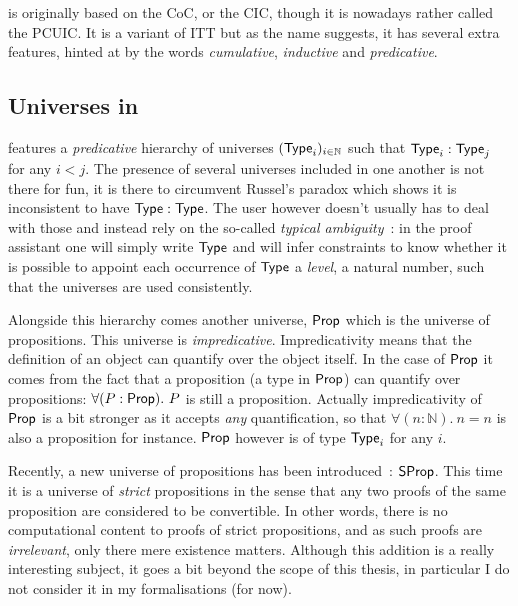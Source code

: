 \Coq is originally based on the \acrfull{CoC}, or the \acrfull{CIC}, though it
is nowadays rather called the \acrfull{PCUIC}.
It is a variant of \acrshort{ITT} but as the name suggests, it has several
extra features, hinted at by the words \emph{cumulative}, \emph{inductive}
and \emph{predicative}.

\subsection{Universes in \Coq}

\Coq features a \emph{predicative} hierarchy of universes
\((\mathsf{Type}_i)_{i \in \mathbb{N}}\) such that \(\mathsf{Type}_i : \mathsf{Type}_j\) for any
\(i < j\). The presence of several universes included in one another is not
there for fun, it is there to circumvent Russel's paradox which
shows it is inconsistent to have \(\mathsf{Type} : \mathsf{Type}\).
The \Coq user however doesn't usually has to deal with those and
instead rely on the so-called
\emph{typical ambiguity}~:
in the \Coq proof assistant one will simply write \(\mathsf{Type}\) and \Coq will infer
constraints to know whether it is possible to appoint each occurrence of
\(\mathsf{Type}\) a \emph{level}, \ie a natural number, such that the universes are used
consistently.

Alongside this hierarchy comes another universe, \(\mathsf{Prop}\) which is the universe
of propositions. This universe is \emph{impredicative}.
Impredicativity means that the definition of an object can quantify over the
object itself. In the case of \(\mathsf{Prop}\) it comes from the fact that a
proposition (\ie a type in \(\mathsf{Prop}\)) can quantify over propositions: \eg
\(\forall (P : \mathsf{Prop}).\ P\) is still a proposition.
Actually impredicativity of \(\mathsf{Prop}\) is a bit stronger as it accepts \emph{any}
quantification, so that \(\forall (n : \mathbb{N}).\ n = n\) is also a
proposition for instance.
\(\mathsf{Prop}\) however is of type \(\mathsf{Type}_i\) for any \(i\).

Recently, a new universe of propositions has been
introduced~: \(\mathsf{SProp}\).
This time it is a universe of \emph{strict} propositions in the sense that any
two proofs of the same proposition are considered to be convertible.
In other words, there is no computational content to proofs of strict
propositions, and as such proofs are \emph{irrelevant}, only there mere
existence matters.
Although this addition is a really interesting subject, it goes a bit beyond
the scope of this thesis, in particular I do not consider it in my
formalisations (for now).

